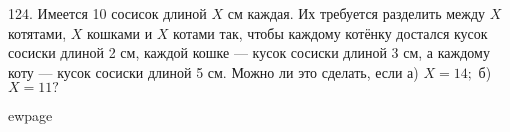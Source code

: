 124. Имеется 10 сосисок длиной $X$ см каждая. Их требуется разделить между $X$ котятами, $X$ кошками и $X$ котами так, чтобы каждому котёнку достался кусок сосиски длиной 2 см, каждой кошке ---
кусок сосиски длиной 3 см, а каждому коту --- кусок сосиски длиной 5 см. Можно ли это сделать, если а) $X = 14;$ б) $X = 11?$

ewpage
